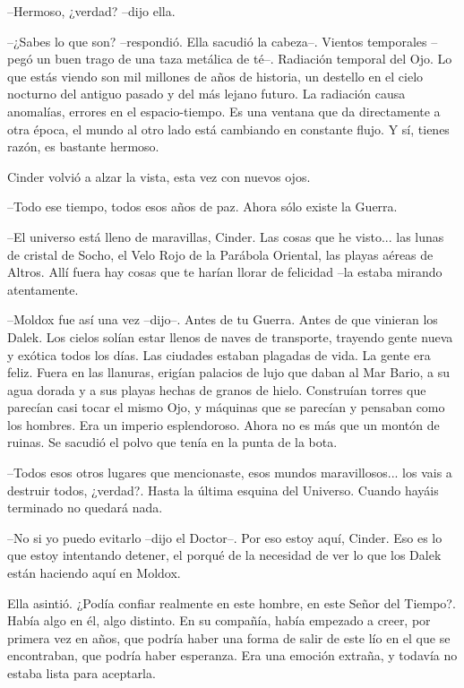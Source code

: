 --Hermoso, ¿verdad? --dijo ella.

--¿Sabes lo que son? --respondió. Ella sacudió la cabeza--. Vientos temporales --pegó un buen trago de una taza metálica de té--. Radiación temporal del Ojo. Lo que estás viendo son mil millones de años de historia, un destello en el cielo nocturno del antiguo pasado y del más lejano futuro. La radiación causa anomalías, errores en el espacio-tiempo. Es una ventana que da directamente a otra época, el mundo al otro lado está cambiando en constante flujo. Y sí, tienes razón, es bastante hermoso.

Cinder volvió a alzar la vista, esta vez con nuevos ojos.

--Todo ese tiempo, todos esos años de paz. Ahora sólo existe la Guerra.

--El universo está lleno de maravillas, Cinder. Las cosas que he visto... las lunas de cristal de Socho, el Velo Rojo de la Parábola Oriental, las playas aéreas de Altros. Allí fuera hay cosas que te harían llorar de felicidad --la estaba mirando atentamente.

--Moldox fue así una vez --dijo--. Antes de tu Guerra. Antes de que vinieran los Dalek. Los cielos solían estar llenos de naves de transporte, trayendo gente nueva y exótica todos los días. Las ciudades estaban plagadas de vida. La gente era feliz. Fuera en las llanuras, erigían palacios de lujo que daban al Mar Bario, a su agua dorada y a sus playas hechas de granos de hielo. Construían torres que parecían casi tocar el mismo Ojo, y máquinas que se parecían y pensaban como los hombres. Era un imperio esplendoroso. Ahora no es más que un montón de ruinas.
Se sacudió el polvo que tenía en la punta de la bota.

--Todos esos otros lugares que mencionaste, esos mundos maravillosos... los vais a destruir todos, ¿verdad?. Hasta la última esquina del Universo. Cuando hayáis terminado no quedará nada.

--No si yo puedo evitarlo --dijo el Doctor--. Por eso estoy aquí, Cinder. Eso es lo que estoy intentando detener, el porqué de la necesidad de ver lo que los Dalek están haciendo aquí en Moldox.

Ella asintió. ¿Podía confiar realmente en este hombre, en este Señor del Tiempo?. Había algo en él, algo distinto. En su compañía, había empezado a creer, por primera vez en años, que podría haber una forma de salir de este lío en el que se encontraban, que podría haber esperanza. Era una emoción extraña, y todavía no estaba lista para aceptarla.

